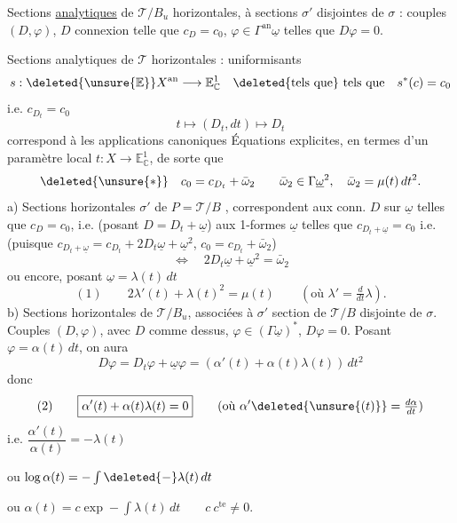 Sections \uline{analytiques} de $\mathcal T/B_u$ horizontales,  à sections $\sigma'$ disjointes de $\sigma$ : couples  $(D,\varphi)$, $D$ connexion  telle que $c_D=c_0$, $\varphi\in\Gamma^{\mathrm{an}}\underline\omega$ telles que $D\varphi=0$.

Sections analytiques de $\mathcal T$ horizontales  : uniformisants
\[
s:\deleted{\unsure{\mathbb E}}X^{\mathrm{an}}\longrightarrow\mathbb E^1_{\mathbb C}
\quad\text{\deleted{tels que} tels que}\quad s^*(c)=c_0
\]
i.e. $c_{D_t}=c_0$
\[
t\longmapsto(D_t,dt)\longmapsto D_t
\]
correspond à les applications canoniques
Équations explicites, en termes d'un paramètre local $t:X\longrightarrow\mathbb E^1_{\mathbb C}$, de sorte que
\[
\deleted{\unsure{*}}\quad c_0=c_{D_t}+\bar\omega_2\qquad \bar\omega_2\in\Gamma\underline\omega^2,\quad\bar\omega_2=\mu(t)\,dt^2.
\]
a) Sections horizontales $\sigma'$ de $P=\mathcal T/B$ , correspondent aux conn. $D$ sur $\underline\omega$ telles que $c_D=c_0$, i.e. (posant $D=D_t+\underline\omega$) aux 1-formes $\underline\omega$ telles que $c_{D_t+\underline\omega}=c_0$ i.e. (puisque $c_{D_t+\underline\omega}=c_{D_t}+2D_t\underline\omega+\underline\omega^2$, $c_0=c_{D_t}+\bar\omega_2$)
\[
\Longleftrightarrow\quad 2D_t\underline\omega+\underline\omega^2=\bar\omega_2
\]
ou encore, posant $\underline\omega=\lambda(t)\,dt$
\[
(1)\qquad\boxed{2\lambda'(t)+\lambda(t)^2=\mu(t)}\qquad(\text{où }\lambda'=\tfrac d{dt}\lambda).
\]
b) Sections horizontales de $\mathcal T/B_u$, associées à $\sigma'$ section de $\mathcal T/B$ disjointe de $\sigma$. Couples $(D,\varphi)$, avec $D$ comme dessus, $\varphi\in(\Gamma\underline\omega)^*$, $D\varphi=0$. Posant $\varphi=\alpha(t)\,dt$, on aura
\[
D\varphi=D_t\varphi+\underline\omega\varphi=(\alpha'(t)+\alpha(t)\lambda(t))\,dt^2
\]
donc
\[
(2)\qquad\boxed{\alpha'(t)+\alpha(t)\lambda(t)=0}\qquad(\text{où }\alpha'\deleted{\unsure{(t)}}=\tfrac{d\alpha}{dt})
\]
i.e. $\dfrac{\alpha'(t)}{\alpha(t)}=-\lambda(t)$

ou $\log\alpha(t)=-\int\deleted{-}\lambda(t)\,dt$

ou $\alpha(t)=c\exp-\int\lambda(t)\,dt\qquad c\ c^{\mathrm{te}}\ne0$.

